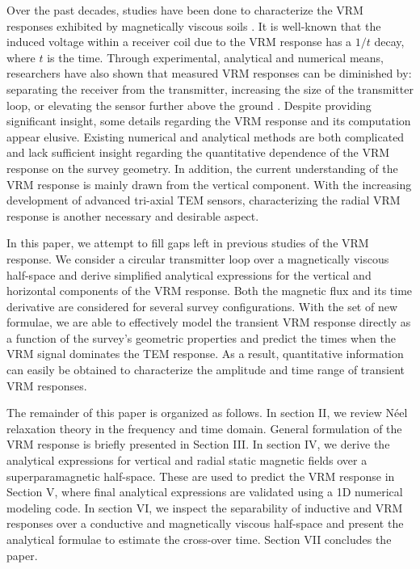 \documentclass[journal]{IEEEtran}  %
\begin{document}
Over the past decades, studies have been done to characterize the VRM responses exhibited by magnetically viscous soils \cite{Pasion2002, Butler2003, Billings2003,Pasion2007, Buselli1982,Barsukov2001,Zadorozhnaya2012}.  It is well-known that the induced voltage within a receiver coil due to the VRM  response has a $1/t$ decay, where $t$ is the time. Through experimental, analytical and numerical means, researchers have also shown  that measured VRM responses can be diminished by: separating the receiver from the transmitter, increasing the size of the transmitter loop, or elevating the sensor further above the ground \cite{Lee1984, Buselli1982, Barsukov2001, Das2006, Kozhevnikov2007, Zadorozhnaya2012}. Despite providing significant insight, some details regarding the VRM response and its computation appear elusive. Existing numerical and analytical methods \cite{Billings2003, Kozhevnikov2007, Pasion2007, Barsukov2001, Das2004, Dryuts2009, Lee1984, Das2006} are both complicated and lack  sufficient insight regarding the quantitative dependence of the VRM response on the survey geometry. In addition, the current understanding of the VRM response is mainly drawn from the vertical component. With the increasing development of advanced tri-axial TEM sensors, characterizing the radial VRM response is another necessary and desirable aspect.

In this paper, we attempt to fill gaps left in previous studies of the VRM response. We consider a circular transmitter loop over a magnetically viscous half-space and derive simplified analytical expressions for the vertical and horizontal components of the VRM response. Both the magnetic flux and its time derivative are considered for several survey configurations. With the set of new formulae, we are able to effectively model the transient VRM response directly as a function of the survey's geometric properties and predict the times when the VRM signal dominates the TEM response. As a result, quantitative information can easily be obtained to characterize the amplitude and time range of transient VRM responses.

The remainder of this paper is organized as follows. In section II, we review N\'{e}el relaxation theory in the frequency and time domain. General formulation of the VRM response is briefly presented in Section III. In section IV, we derive the analytical expressions for vertical and radial static magnetic fields over a superparamagnetic half-space. These are used to predict the VRM response in Section V, where final analytical expressions are validated using a 1D numerical modeling code. In section VI, we inspect the separability of inductive and VRM responses over a conductive and magnetically viscous half-space and present the analytical formulae to estimate the cross-over time. Section VII concludes the paper.
\end{document}
